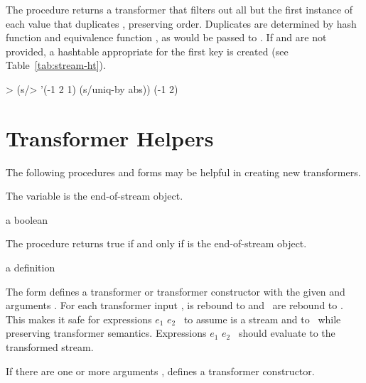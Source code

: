 The  procedure returns a transformer that filters out all but the first
instance of each value  that duplicates ,
preserving order. Duplicates are determined by hash function  and equivalence
function , as would be passed to . If  and
 are not provided, a hashtable appropriate for the first key is created (see
Table~\ref{tab:stream-ht}).

\codebegin
> (s/> '(-1 2 1) (s/uniq-by abs))
(-1 2)
\codeend

\section {Transformer Helpers}

The following procedures and forms may be helpful in creating new transformers.

\begin{variable}
\end{variable}
\antipar

The  variable is the end-of-stream object.

\begin{procedure}
\end{procedure}
\returns{} a boolean

The  procedure returns true if and only if  is the end-of-stream object.

\begin{syntax}
\end{syntax}
\expandsto{} a definition

The  form defines a transformer or transformer constructor
with the given  and arguments  \etc. For each transformer input
,  is rebound to  and  \etc\ are
rebound to  \etc. This makes it safe for expressions $e_1$ $e_2$ \etc\ to
assume  is a stream and to   \etc\ while preserving transformer
semantics. Expressions $e_1$ $e_2$ \etc\ should evaluate to the transformed stream.

If there are one or more arguments  \etc, 
defines a transformer constructor.

